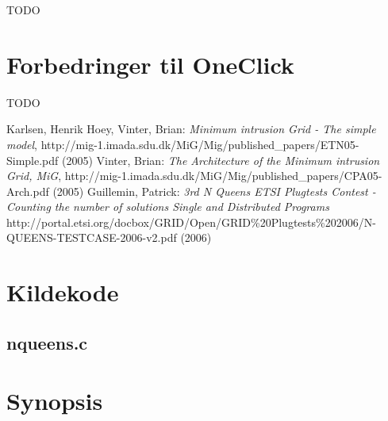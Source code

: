 \documentclass[draft,a4paper,10pt]{article}
\begin{document}


TODO
\section{Forbedringer til OneClick}
%
TODO


\begin{thebibliography}{99}
 Karlsen, Henrik Hoey, Vinter, Brian:
\emph{Minimum intrusion Grid - The simple model},
http://mig-1.imada.sdu.dk/MiG/Mig/published\_papers/ETN05-Simple.pdf (2005)
 Vinter, Brian:
\emph{The Architecture of the Minimum intrusion Grid, MiG},
http://mig-1.imada.sdu.dk/MiG/Mig/published\_papers/CPA05-Arch.pdf
(2005)
 Guillemin, Patrick:
\emph{3rd N Queens ETSI Plugtests Contest - Counting the number of
  solutions Single and Distributed Programs}
http://portal.etsi.org/docbox/GRID/Open/GRID\%20Plugtests\%202006/N-QUEENS-TESTCASE-2006-v2.pdf (2006)
\end{thebibliography}



\appendix

\section{Kildekode}
\subsection{nqueens.c}
%

\section{Synopsis}
%



%
\end{document}
